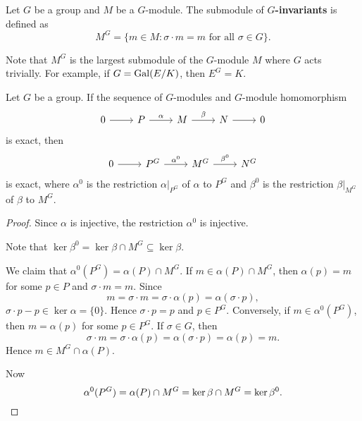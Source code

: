 \begin{definition}
    Let $G$ be a group and $M$ be a $G$-module.
    The submodule of \textbf{$G$-invariants} is defined as
    \[
    M^G=\{m\in M:\sigma\cdot m=m\text{ for all $\sigma\in G$}\}.
    \]
\end{definition}

Note that $M^G$ is the largest submodule of the $G$-module 
$M$ where $G$ acts trivially. For example, if 
$G=\operatorname{Gal}(E/K)$, then $E^G=K$. 

\begin{proposition}
\label{pro:H0}
    Let $G$ be a group. If the sequence
of $G$-modules and $G$-module homomorphism
\[
\begin{tikzcd}
    0 & P & M & N & 0
    \arrow[from=1-1, to=1-2]
    \arrow["\alpha", from=1-2, to=1-3]
    \arrow["\beta", from=1-3, to=1-4]
    \arrow[from=1-4, to=1-5]
    \end{tikzcd}\]
is exact, then 
\[
\begin{tikzcd}
                        0 & P^G & M^G & N^G 
                        \arrow[from=1-1, to=1-2]
                        \arrow["\alpha^0", from=1-2, to=1-3]
                        \arrow["\beta^0", from=1-3, to=1-4]
        \end{tikzcd}
        \]
is exact, where $\alpha^0$ is the restriction $\alpha|_{P^G}$ of $\alpha$ to $P^G$ and
$\beta^0$ is the restriction $\beta|_{M^G}$ of $\beta$ to $M^G$. 
\end{proposition}

\begin{proof}
    Since $\alpha$ is injective, the restriction $\alpha^0$ is injective. 

    Note that 
    $\ker\beta^0=\ker\beta\cap M^G\subseteq\ker\beta$. 
    
    We claim 
    that $\alpha^0(P^G)=\alpha(P)\cap M^G$. If $m\in\alpha(P)\cap M^G$, then 
    $\alpha(p)=m$ for some $p\in P$ and $\sigma\cdot m=m$. Since
    \[
    m=\sigma\cdot m=\sigma\cdot\alpha(p)=\alpha(\sigma\cdot p),
    \]
    $\sigma\cdot p-p\in\ker\alpha=\{0\}$. Hence $\sigma\cdot p=p$ and
    $p\in P^G$. Conversely, if $m\in\alpha^0(P^G)$, then 
    $m=\alpha(p)$ for some $p\in P^G$. If $\sigma\in G$, then
    \[
    \sigma\cdot m=\sigma\cdot\alpha(p)=\alpha(\sigma\cdot p)=\alpha(p)=m.
    \]
    Hence $m\in M^G\cap\alpha(P)$.

    Now
    \[
    \alpha^0(P^G)=\alpha(P)\cap M^G=\ker\beta\cap M^G=\ker\beta^0.\qedhere  
    \]
\end{proof}

